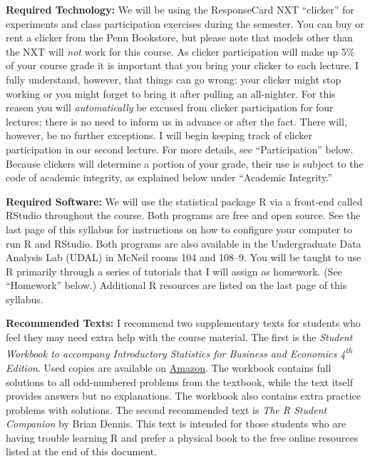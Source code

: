 \documentclass[11pt, letterpaper]{article}
\begin{document}
\noindent \textbf{Required Technology: } 
We will be using the ResponseCard NXT ``clicker'' for experiments and class participation exercises during the semester. You can buy or rent a clicker from the Penn Bookstore, but please note that models other than the NXT will \emph{not} work for this course. 
As clicker participation will make up 5\% of your course grade it is important that you bring your clicker to each lecture. 
I fully understand, however, that things can go wrong: your clicker might stop working or you might forget to bring it after pulling an all-nighter.
For this reason you will \emph{automatically} be excused from clicker participation for four lectures: there is no need to inform us in advance or after the fact. There will, however, be no further exceptions. 
I will begin keeping track of clicker participation in our second lecture. For more details, see ``Participation'' below. 
Because clickers will determine a portion of your grade, their use is subject to the code of academic integrity, as explained below under ``Academic Integrity.'' 

\newpage

\noindent \textbf{Required Software:} 
We will use the statistical package R via a front-end called RStudio throughout the course. 
Both programs are free and open source. See the last page of this syllabus for instructions on how to configure your computer to run R and RStudio. Both programs are also available in the Undergraduate Data Analysis Lab (UDAL) in McNeil rooms 104 and 108--9. 
You will be taught to use R primarily through a series of tutorials that I will assign as homework. (See ``Homework'' below.)  
Additional R resources are listed on the last page of this syllabus.

\bigskip

\noindent \textbf{Recommended Texts:} 
I recommend two supplementary texts for students who feel they may need extra help with the course material. 
The first is the \emph{Student Workbook to accompany Introductory Statistics for Business and Economics 4\textsuperscript{th} Edition}. 
Used copies are available on \href{http://www.amazon.com/gp/offer-listing/0471508993/sr=/qid=/ref=olp_page_2?ie=UTF8&colid=&coliid=&condition=all&me=&qid=&shipPromoFilter=0&sort=sip&sr=&startIndex=10}{Amazon}. 
The workbook contains full solutions to all odd-numbered problems from the textbook, while the text itself provides answers but no explanations. 
The workbook also contains extra practice problems with solutions. The second recommended text is \emph{The R Student Companion} by Brian Dennis.
This text is intended for those students who are having trouble learning R and prefer a physical book to the free online resources listed at the end of this document. 
\end{document}
